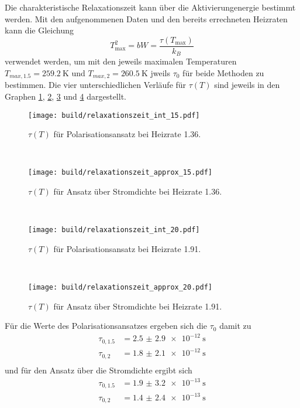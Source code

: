 Die charakteristische Relaxationszeit kann über die Aktivierungenergie bestimmt werden. Mit den aufgenommenen Daten  und den bereits 
errechneten Heizraten kann die Gleichung 
\begin{equation}
    T^2_\text{max} = bW = \frac{\tau(T_\text{max})}{k_B} 
\end{equation} 
verwendet werden, um mit den jeweils maximalen Temperaturen $T_{max,1.5} = \SI{259.2}{\kelvin} $ und $T_{max,2} = \SI{260.5}{\kelvin} $ 
jweils $\tau_0$  für beide Methoden zu bestimmen. Die vier unterschiedlichen Verläufe für $\tau(T)$ sind jeweils in den Graphen \ref{fig:tau_int_15}, 
\ref{fig:tau_apr_15}, \ref{fig:tau_int_20} und \ref{fig:tau_apr_20} dargestellt. 
\\
\begin{figure}
    \centering
    \texttt{[image: build/relaxationszeit\_int\_15.pdf]}
    \caption{$\tau(T)$ für Polarisationsansatz bei Heizrate 1.36.}
    \label{fig:tau_int_15}
\end{figure}
\\
\begin{figure}
    \centering
    \texttt{[image: build/relaxationszeit\_approx\_15.pdf]}
    \caption{$\tau(T)$ für Ansatz über Stromdichte bei Heizrate 1.36.}
    \label{fig:tau_apr_15}
\end{figure}
\\
\begin{figure}
    \centering
    \texttt{[image: build/relaxationszeit\_int\_20.pdf]}
    \caption{$\tau(T)$ für Polarisationsansatz bei Heizrate 1.91.}
    \label{fig:tau_int_20}
\end{figure}
\\
\begin{figure}
    \centering
    \texttt{[image: build/relaxationszeit\_approx\_20.pdf]}
    \caption{$\tau(T)$ für Ansatz über Stromdichte bei Heizrate 1.91.}
    \label{fig:tau_apr_20}
\end{figure}
\FloatBarrier
Für die Werte des Polarisationsansatzes ergeben sich die $\tau_0$ damit zu 
\begin{align*}
    \tau_{0,1.5} &= \SI{2.5(29)e-12}{\second}\\
    \tau_{0,2}   &= \SI{1.8(21)e-12}{\second}\\ 
\end{align*}
und für den Ansatz über die Stromdichte ergibt sich 
\begin{align*}
    \tau_{0,1.5} &= \SI{1.9(32)e-13}{\second}\\
    \tau_{0,2}   &= \SI{1.4(24)e-13}{\second}\\ 
\end{align*}

